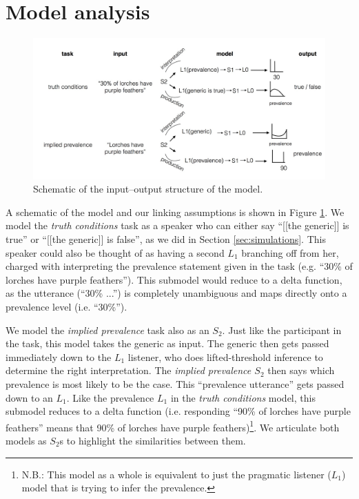 \documentclass[10pt,letterpaper]{article}
\begin{document}
\section{Model analysis}

\begin{figure}
\centering
    \includegraphics[width=\columnwidth]{model_schematic}
    \caption{Schematic of the input--output structure of the model.}
  \label{fig:model}
\end{figure}

A schematic of the model and our linking assumptions is shown in Figure \ref{fig:model}. We model the \emph{truth conditions} task as a speaker who can either say ``[[the generic]] is true'' or ``[[the generic]] is false'', as we did in Section \ref{sec:simulations}. This speaker could also be thought of as having a second $L_{1}$ branching off from her, charged with interpreting the prevalence statement given in the task (e.g. ``30\% of lorches have purple feathers''). This submodel would reduce to a delta function, as the utterance (``30\% ...'') is completely unambiguous and maps directly onto a prevalence level (i.e. ``30\%'').

We model the \emph{implied prevalence} task also as an $S_{2}$. Just like the participant in the task, this model takes the generic as input. The generic then gets passed immediately down to the $L_{1}$ listener, who does lifted-threshold inference to determine the right interpretation. The \emph{implied prevalence $S_{2}$} then says which prevalence is most likely to be the case. This ``prevalence utterance'' gets passed down to an $L_{1}$. Like the prevalence $L_{1}$ in the \emph{truth conditions} model, this submodel reduces to a delta function (i.e. responding ``90\% of lorches have purple feathers'' means that 90\% of lorches have purple feathers)\footnote{N.B.: This model as a whole is equivalent to just the pragmatic listener ($L_{1}$) model that is trying to infer the prevalence.}. We articulate both models as $S_{2}$s to highlight the similarities between them.
\end{document}
